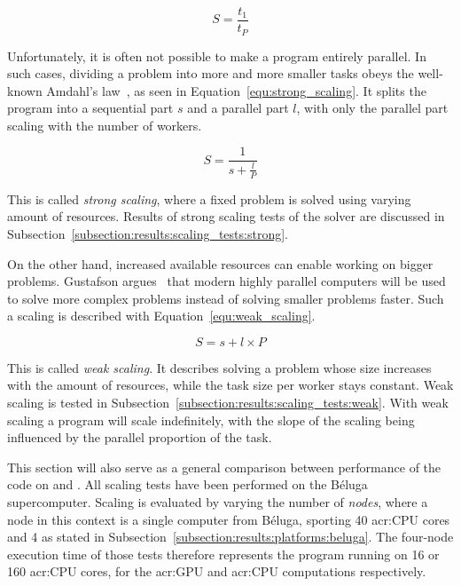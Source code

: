 \begin{equation} \label{equ:scaling}
    S = \frac{t_1}{t_P}
\end{equation}

Unfortunately, it is often not possible to make a program entirely parallel. In such cases, dividing
a problem into more and more smaller tasks obeys the well-known Amdahl's law~\cite{Amdahl1967}, as
seen in Equation~\ref{equ:strong_scaling}. It splits the program into a sequential part \(s\) and a
parallel part \(l\), with only the parallel part scaling with the number of workers.

\begin{equation} \label{equ:strong_scaling}
    S = \frac{1}{s + \frac{l}{P}}
\end{equation}

This is called \textit{strong scaling}, where a fixed problem is solved using varying amount of
resources. Results of strong scaling tests of the solver are discussed in
Subsection~\ref{subsection:results:scaling_tests:strong}.

On the other hand, increased available resources can enable working on bigger problems. Gustafson
argues~\cite{Gustafson1988} that modern highly parallel computers will be used to solve more complex
problems instead of solving smaller problems faster. Such a scaling is described with
Equation~\ref{equ:weak_scaling}.

\begin{equation} \label{equ:weak_scaling}
    S = s + l \times P
\end{equation}

This is called \textit{weak scaling}. It describes solving a problem whose size increases with the
amount of resources, while the task size per worker stays constant. Weak scaling is tested in
Subsection~\ref{subsection:results:scaling_tests:weak}. With weak scaling a program will scale
indefinitely, with the slope of the scaling being influenced by the parallel proportion of the task.

This section will also serve as a general comparison between performance of the code on
 and . All scaling tests have been performed on the Béluga
supercomputer. Scaling is evaluated by varying the number of \textit{nodes}, where a node in this
context is a single computer from Béluga, sporting 40 \acrshort{acr:CPU} cores and 4
 as stated in Subsection~\ref{subsection:results:platforms:beluga}. The
four-node execution time of those tests therefore represents the program running on 16
 or 160 \acrshort{acr:CPU} cores, for the \acrshort{acr:GPU} and
\acrshort{acr:CPU} computations respectively.

